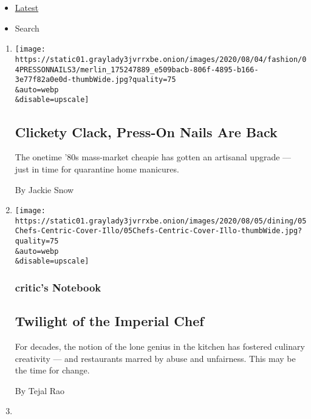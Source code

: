 \begin{itemize}
\tightlist
\item
  \protect\hyperlink{stream-panel}{Latest}
\item
  Search
\end{itemize}

\begin{enumerate}
\def\labelenumi{\arabic{enumi}.}
\item
  \href{/2020/08/04/style/self-care/press-on-nails.html}{}

  \texttt{[image: https://static01.graylady3jvrrxbe.onion/images/2020/08/04/fashion/04PRESSONNAILS3/merlin\_175247889\_e509bacb-806f-4895-b166-3e77f82a0e0d-thumbWide.jpg?quality=75\\\&auto=webp\\\&disable=upscale]}

  \hypertarget{clickety-clack-press-on-nails-are-back}{%
  \subsection{Clickety Clack, Press-On Nails Are
  Back}\label{clickety-clack-press-on-nails-are-back}}

  The onetime '80s mass-market cheapie has gotten an artisanal upgrade
  --- just in time for quarantine home manicures.

  By Jackie Snow
\item
  \href{/2020/08/04/dining/chef-restaurant-culture.html}{}

  \texttt{[image: https://static01.graylady3jvrrxbe.onion/images/2020/08/05/dining/05Chefs-Centric-Cover-Illo/05Chefs-Centric-Cover-Illo-thumbWide.jpg?quality=75\\\&auto=webp\\\&disable=upscale]}

  \hypertarget{critics-notebook}{%
  \subsubsection{critic's Notebook}\label{critics-notebook}}

  \hypertarget{twilight-of-the-imperial-chef}{%
  \subsection{Twilight of the Imperial
  Chef}\label{twilight-of-the-imperial-chef}}

  For decades, the notion of the lone genius in the kitchen has fostered
  culinary creativity --- and restaurants marred by abuse and
  unfairness. This may be the time for change.

  By Tejal Rao
\item
  \href{/2020/08/04/business/coronavirus-struggling-caterers.html}{}


\end{enumerate}
